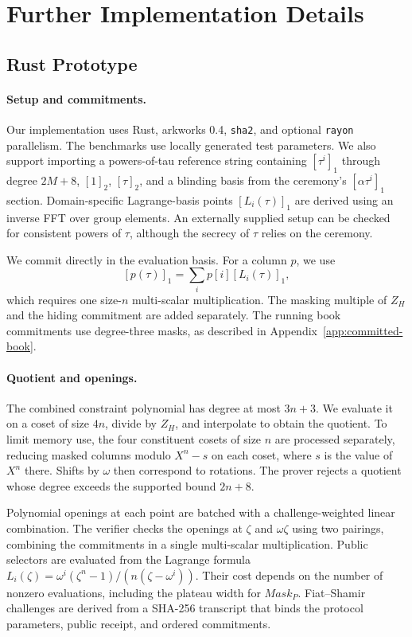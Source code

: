 
\section{Further Implementation Details}
\label{app:zq-implementation}

\subsection{Rust Prototype}
\label{app:zq-rust}

\paragraph{Setup and commitments.} Our implementation uses Rust, arkworks 0.4, \texttt{sha2}, and optional \texttt{rayon} parallelism. The benchmarks use locally generated test parameters. We also support importing a powers-of-tau reference string containing \([\tau^i]_1\) through degree \(2M+8\), \([1]_2\), \([\tau]_2\), and a blinding basis from the ceremony's \([\alpha\tau^i]_1\) section. Domain-specific Lagrange-basis points \([L_i(\tau)]_1\) are derived using an inverse FFT over group elements. An externally supplied setup can be checked for consistent powers of \(\tau\), although the secrecy of \(\tau\) relies on the ceremony.

We commit directly in the evaluation basis. For a column \(p\), we use
\[
[p(\tau)]_1=\sum_i p[i][L_i(\tau)]_1,
\]
which requires one size-\(n\) multi-scalar multiplication. The masking multiple of \(Z_H\) and the hiding commitment are added separately. The running book commitments use degree-three masks, as described in Appendix~\ref{app:committed-book}.

\paragraph{Quotient and openings.} The combined constraint polynomial has degree at most \(3n+3\). We evaluate it on a coset of size \(4n\), divide by \(Z_H\), and interpolate to obtain the quotient. To limit memory use, the four constituent cosets of size \(n\) are processed separately, reducing masked columns modulo \(X^n-s\) on each coset, where \(s\) is the value of \(X^n\) there. Shifts by \(\omega\) then correspond to rotations. The prover rejects a quotient whose degree exceeds the supported bound \(2n+8\).

Polynomial openings at each point are batched with a challenge-weighted linear combination. The verifier checks the openings at \(\zeta\) and \(\omega\zeta\) using two pairings, combining the commitments in a single multi-scalar multiplication. Public selectors are evaluated from the Lagrange formula \(L_i(\zeta)=\omega^i(\zeta^n-1)/(n(\zeta-\omega^i))\). Their cost depends on the number of nonzero evaluations, including the plateau width for \(Mask_P\). Fiat--Shamir challenges are derived from a SHA-256 transcript that binds the protocol parameters, public receipt, and ordered commitments.

